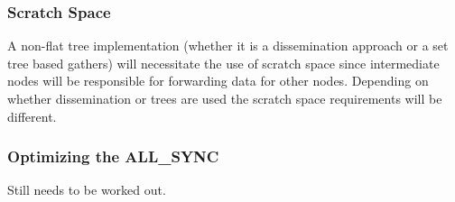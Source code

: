 \documentclass[times,10pt]{article}
\begin{document}
\subsubsection{Scratch Space}
A non-flat tree implementation (whether it is a dissemination approach or a set tree based gathers) will necessitate the use of scratch space since intermediate nodes will be responsible for forwarding data for other nodes. Depending on whether dissemination or trees are used the scratch space requirements will be different.

\subsubsection{Optimizing the ALL\_SYNC} 
Still needs to be worked out.


%
%
%
%
%
%
%
%
\end{document}
